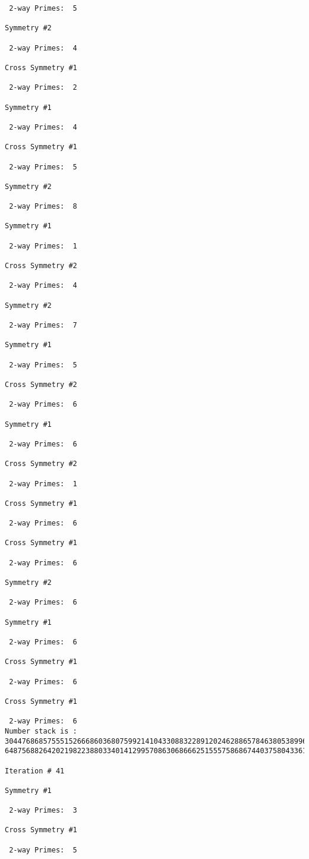 {{{{\begin{verbatim}
 2-way Primes: 	5

Symmetry #2

 2-way Primes: 	4

Cross Symmetry #1

 2-way Primes: 	2

Symmetry #1

 2-way Primes: 	4

Cross Symmetry #1

 2-way Primes: 	5

Symmetry #2

 2-way Primes: 	8

Symmetry #1

 2-way Primes: 	1

Cross Symmetry #2

 2-way Primes: 	4

Symmetry #2

 2-way Primes: 	7

Symmetry #1

 2-way Primes: 	5

Cross Symmetry #2

 2-way Primes: 	6

Symmetry #1

 2-way Primes: 	6

Cross Symmetry #2

 2-way Primes: 	1

Cross Symmetry #1

 2-way Primes: 	6

Cross Symmetry #1

 2-way Primes: 	6

Symmetry #2

 2-way Primes: 	6

Symmetry #1

 2-way Primes: 	6

Cross Symmetry #1

 2-way Primes: 	6

Cross Symmetry #1

 2-way Primes: 	6
Number stack is :
30447686857555152666860368075992141043308832289120246288657846380538996794608835958544046240163340857
64875688264202198223880334014129957086306866625155575868674403758043361042640445859538806497699835083

Iteration #	41

Symmetry #1

 2-way Primes: 	3

Cross Symmetry #1

 2-way Primes: 	5


\end{verbatim}}}}}
